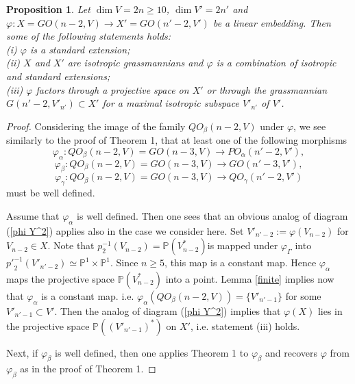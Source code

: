 \documentclass[12pt]{amsart}
\renewcommand{\phi}{\varphi}
\newtheorem{proposition}[theorem]{Proposition}
\theoremstyle{definition}
\begin{document}
\begin{proposition}\label{case n-2 etc}
Let $\dim V=2n\ge10$, $\dim V'=2n'$ and $\phi:X=GO(n-2,V)\to X'=GO(n'-2,V')$ be a linear embedding.
Then some of the following statements holds:\\
(i) $\phi$ is a standard extension;\\
(ii) $X$ and $X'$ are isotropic grassmannians and $\phi$ is a combination of isotropic and standard
extensions;\\
(iii) $\phi$ factors through a projective space on $X'$ or
through the grassmannian $G(n'-2,V'_{n'})\subset X'$ for a maximal isotropic subspace $V'_{n'}$ of $V'$.
\end{proposition}
\begin{proof}
Considering the image of the family $QO_{\beta}(n-2,V)$ under $\phi$, we see similarly to the proof of Theorem 1,
that at least one of the following morphisms
\begin{equation}\label{phi alpha}
\phi_{\alpha}: QO_{\beta}(n-2,V)=GO(n-3,V)\to PO_{\alpha}(n'-2,V'),
\end{equation}
\begin{equation}\label{phi beta}
\phi_{\beta}: QO_{\beta}(n-2,V)=GO(n-3,V)\to GO(n'-3,V'),
\end{equation}
\begin{equation}\label{phi gamma}
\phi_{\gamma}: QO_{\beta}(n-2,V)=GO(n-3,V)\to QO_{\gamma}(n'-2,V')
\end{equation}
must be well defined.

Assume that $\phi_{\alpha}$ is well defined. Then one sees that an obvious analog of diagram (\ref{phi Y^2})
applies also in the case we consider here. Set $V'_{n'-2}:=\phi(V_{n-2})$ for $V_{n-2}\in X$.
Note that $p_2^{-1}(V_{n-2})=\mathbb{P}(V_{n-2}^*)$is mapped under $\phi_{\Gamma}$ into
${p'}_2^{-1}(V'_{n'-2})\simeq\mathbb{P}^1\times\mathbb{P}^1$. Since $n\ge5$,
this map is a constant map. Hence $\phi_{\alpha}$ maps the projective space $\mathbb{P}(V_{n-2}^*)$ into a point.
Lemma \ref{finite} implies now that $\phi_{\alpha}$ is a constant map.
i.e. $\phi_{\alpha}(QO_{\beta}(n-2,V))=\{V'_{n'-1}\}$ for some $V'_{n'-1}\subset V'$. Then the analog of diagram
(\ref{phi Y^2}) implies that $\phi(X)$ lies in the projective space $\mathbb{P}((V'_{n'-1})^*)$ on $X'$, i.e.
statement (iii) holds.

Next, if $\phi_{\beta}$ is well defined, then one applies Theorem 1 to $\phi_{\beta}$ and recovers $\phi$ from
$\phi_{\beta}$ as in the proof of Theorem 1.



\end{proof}
\end{document}
